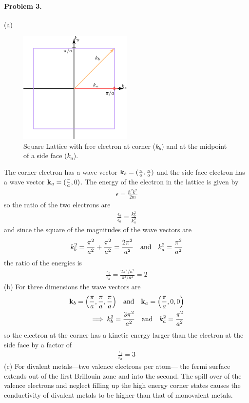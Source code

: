 \documentclass[../main.tex]{subfiles}
\begin{document}
\paragraph*{Problem 3.} (a)
\begin{figure}[ht]
    \centering
    \includegraphics[width=0.5\textwidth]{hw4.png}
    \caption{Square Lattice with free electron at corner ($k_b$) and at the midpoint of a side
    face ($k_a$).}
    \label{fig:hw4_3a}
\end{figure}
The corner electron has a wave vector $\vb k_b = (\frac{\pi}{a}, \frac{\pi}{a})$ and the side face
electron has a wave vector $\vb k_a = (\frac{\pi}{a}, 0)$. The energy of the electron in the lattice 
is given by
\begin{align*}
    \epsilon = \frac{\hbar^2 k^2}{2m}
\end{align*}
so the ratio of the two electrons are
\begin{align*}
    \frac{\epsilon_b}{\epsilon_a} = \frac{k_b^2}{k_a^2}
\end{align*}
and since the square of the magnitudes of the wave vectors are
\begin{align*}
    k_b^2 = \frac{\pi^2}{a^2} + \frac{\pi^2}{a^2} = \frac{2\pi^2}{a^2} \qand k_a^2 = \frac{\pi^2}{a^2}
\end{align*}
the ratio of the energies is
\begin{align*}
    \frac{\epsilon_b}{\epsilon_a} = \frac{2\pi^2/a^2}{\pi^2/a^2} = 2
\end{align*}
(b) For three dimensions the wave vectors are
\begin{align*}
    \vb k_b =\qt(\frac{\pi}{a}, \frac{\pi}{a}, \frac{\pi}{a}) \qand \vb k_a = \qt(\frac{\pi}{a}, 0, 0) \\
    \implies k_b^2 = \frac{3\pi^2}{a^2} \qand k_a^2 = \frac{\pi^2}{a^2}
\end{align*}
so the electron at the corner has a kinetic energy larger than the electron at the side face by a 
factor of
\begin{align*}
    \frac{\epsilon_b}{\epsilon_a} = 3
\end{align*}
(c) For divalent metals—two valence electrons per atom— the fermi surface extends out of the first 
Brillouin zone and into the second. The spill over of the valence electrons and neglect filling up 
the high energy corner states causes the conductivity of divalent metals to be higher than that of monovalent metals.
\end{document}
